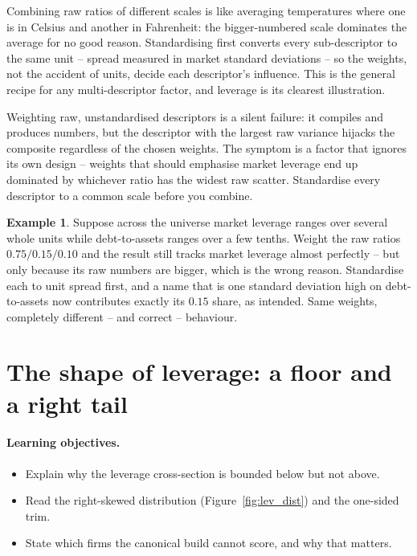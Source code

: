 \documentclass[11pt]{article}
\theoremstyle{definition}
\newtheorem{example}{Example}[section]
\theoremstyle{plain}
\theoremstyle{remark}
\begin{document}
\begin{intuition}
Combining raw ratios of different scales is like averaging temperatures where one is in Celsius and another in Fahrenheit: the bigger-numbered scale dominates the average for no good reason. Standardising first converts every sub-descriptor to the same unit -- spread measured in market standard deviations -- so the weights, not the accident of units, decide each descriptor's influence. This is the general recipe for any multi-descriptor factor, and leverage is its clearest illustration.
\end{intuition}

\begin{pitfall}
Weighting raw, unstandardised descriptors is a silent failure: it compiles and produces numbers, but the descriptor with the largest raw variance hijacks the composite regardless of the chosen weights. The symptom is a factor that ignores its own design -- weights that should emphasise market leverage end up dominated by whichever ratio has the widest raw scatter. Standardise every descriptor to a common scale before you combine.
\end{pitfall}

\begin{example}
Suppose across the universe market leverage ranges over several whole units while debt-to-assets ranges over a few tenths. Weight the raw ratios $0.75/0.15/0.10$ and the result still tracks market leverage almost perfectly -- but only because its raw numbers are bigger, which is the wrong reason. Standardise each to unit spread first, and a name that is one standard deviation high on debt-to-assets now contributes exactly its $0.15$ share, as intended. Same weights, completely different -- and correct -- behaviour.
\end{example}

\section{The shape of leverage: a floor and a right tail}\label{sec:shape}

\paragraph{Learning objectives.}
\begin{itemize}[leftmargin=1.4em,topsep=2pt]
  \item Explain why the leverage cross-section is bounded below but not above.
  \item Read the right-skewed distribution (Figure~\ref{fig:lev_dist}) and the one-sided trim.
  \item State which firms the canonical build cannot score, and why that matters.
\end{itemize}
\end{document}
